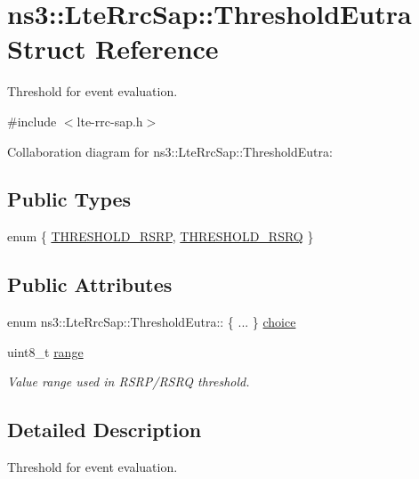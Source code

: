 \hypertarget{structns3_1_1LteRrcSap_1_1ThresholdEutra}{}\section{ns3\+:\+:Lte\+Rrc\+Sap\+:\+:Threshold\+Eutra Struct Reference}
\label{structns3_1_1LteRrcSap_1_1ThresholdEutra}


Threshold for event evaluation.  




{\ttfamily \#include $<$lte-\/rrc-\/sap.\+h$>$}



Collaboration diagram for ns3\+:\+:Lte\+Rrc\+Sap\+:\+:Threshold\+Eutra\+:
\subsection*{Public Types}
\begin{DoxyCompactItemize}
\item 
enum \{ \hyperlink{structns3_1_1LteRrcSap_1_1ThresholdEutra_ad3ed2704b836132980dd2e97cb03822ca0663d5baa9382bd755acb712f6ebf707}{T\+H\+R\+E\+S\+H\+O\+L\+D\+\_\+\+R\+S\+RP}, 
\hyperlink{structns3_1_1LteRrcSap_1_1ThresholdEutra_ad3ed2704b836132980dd2e97cb03822ca6e8bda2b99825f09f53388c29b6402b4}{T\+H\+R\+E\+S\+H\+O\+L\+D\+\_\+\+R\+S\+RQ}
 \}
\end{DoxyCompactItemize}
\subsection*{Public Attributes}
\begin{DoxyCompactItemize}
\item 
enum ns3\+::\+Lte\+Rrc\+Sap\+::\+Threshold\+Eutra\+:: \{ ... \}  \hyperlink{structns3_1_1LteRrcSap_1_1ThresholdEutra_a4c7eed6102d1cd143c063ac845095f75}{choice}
\item 
uint8\+\_\+t \hyperlink{structns3_1_1LteRrcSap_1_1ThresholdEutra_abd4950e20a1a93727535e8364bf85b03}{range}
\begin{DoxyCompactList}\small\item\em Value range used in R\+S\+R\+P/\+R\+S\+RQ threshold. \end{DoxyCompactList}\end{DoxyCompactItemize}


\subsection{Detailed Description}
Threshold for event evaluation. 

